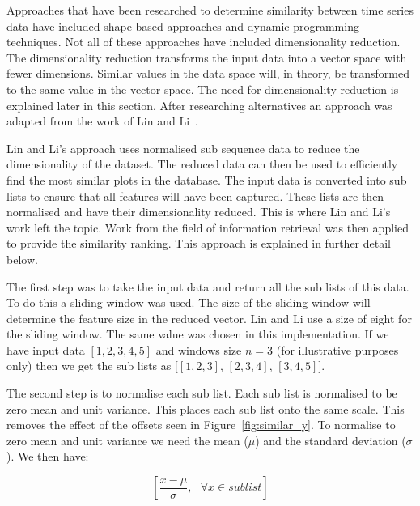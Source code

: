 Approaches that have been researched to determine similarity between time series data have included shape based approaches and dynamic programming techniques.  Not all of these approaches have included dimensionality reduction.  The dimensionality reduction transforms the input data into a vector space with fewer dimensions.  Similar values in the data space will, in theory, be transformed to the same value in the vector space.  The need for dimensionality reduction is explained later in this section.  After researching alternatives an approach was adapted from the work of Lin and Li~\cite{structural_similarity}.

Lin and Li's approach uses normalised sub sequence data to reduce the dimensionality of the dataset.  The reduced data can then be used to efficiently find the most similar plots in the database.  The input data is converted into sub lists to ensure that all features will have been captured.  These lists are then normalised and have their dimensionality reduced.  This is where Lin and Li's work left the topic.  Work from the field of information retrieval was then applied to provide the similarity ranking. This approach is explained in further detail below.

The first step was to take the input data and return all the sub lists of this data.  To do this a sliding window was used.  The size of the sliding window will determine the feature size in the reduced vector.  Lin and Li use a size of eight for the sliding window.  The same value was chosen in this implementation.  If we have input data $[1,2,3,4,5]$ and windows size $n = 3$ (for illustrative purposes only) then we get the sub lists as $[[1,2,3]$, $[2,3,4]$, $[3,4,5]]$.

The second step is to normalise each sub list.  Each sub list is normalised to be zero mean and unit variance.  This places each sub list onto the same scale.  This removes the effect of the offsets seen in Figure~\ref{fig:similar_y}.  To normalise to zero mean and unit variance we need the mean ($\mu$) and the standard deviation ($\sigma$).  We then have:

$$
\left[\frac{x - \mu}{\sigma},\text{   } \forall x \in sublist\right]
$$

